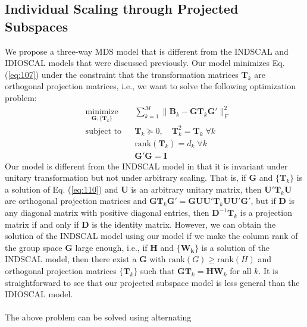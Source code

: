 \subsection{Individual Scaling through Projected Subspaces}
\label{sec:indiv-scal-thro}
We propose a three-way MDS model that is different from the
INDSCAL and IDIOSCAL models that were discussed previously. Our model
minimizes Eq. (\ref{eq:107}) under the constraint that the
transformation matrices $\mathbf{T}_k$ are orthogonal projection
matrices, i.e., we want to solve the following optimization problem:
\begin{equation}
  \label{eq:110}
	\begin{aligned}
	& \underset{\mathbf{G}, \{\mathbf{T}_k\}}{\text{minimize}}
	& & \sum_{k=1}^{M} \| \mathbf{B}_k - \mathbf{G}
\mathbf{T}_k \mathbf{G}' \|_F^2 \\
	& \text{subject to}
	& & \mathbf{T}_k \succeq 0, \quad \mathbf{T}_k^2 = \mathbf{T}_k \;
    \forall k\\
    & & & \mathrm{rank}(\mathbf{T}_k) = d_k \; \forall k \\
	&&& \mathbf{G}' \mathbf{G} = \mathbf{I}
	\end{aligned}
\end{equation}
Our model is different from the INDSCAL model in that it is
invariant under unitary transformation but not under arbitrary
scaling. That is, if $\mathbf{G}$ and $\{\mathbf{T}_k\}$ is a solution
of Eq. (\ref{eq:110}) and $\mathbf{U}$ is an
arbitrary unitary matrix, then $\mathbf{U}' \mathbf{T}_k \mathbf{U}$
are orthogonal projection matrices and $\mathbf{G} \mathbf{T}_k
\mathbf{G}' = \mathbf{G} \mathbf{U} \mathbf{U}' \mathbf{T}_k
\mathbf{U} \mathbf{U}' \mathbf{G}'$, but if $\mathbf{D}$ is any diagonal matrix
with positive diagonal entries, then $\mathbf{D}^{-1} \mathbf{T}_k$ is
a projection matrix if and only if $\mathbf{D}$ is the identity
matrix. However, we can obtain the solution of the INDSCAL model using
our model if we make the column rank of the group space $\mathbf{G}$ large enough,
i.e., if $\mathbf{H}$ and $\{\mathbf{W_k}\}$ is a solution of the
INDSCAL model, then there exist a $\mathbf{G}$ with $\mathrm{rank}(G)
\geq \mathrm{rank}(H)$ and orthogonal projection matrices $\{\mathbf{T}_k\}$
such that $\mathbf{G}\mathbf{T}_k = \mathbf{H}\mathbf{W}_k$ for all
$k$. It is straightforward to see that our projected subspace
model is less general than the IDIOSCAL model. \\ \\
%
%
\noindent The above problem can be solved using alternating
